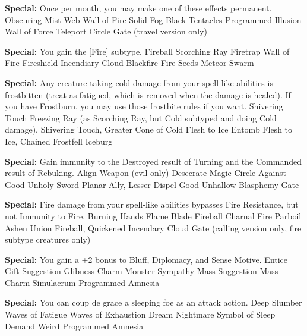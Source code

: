 \begin{multicols}{2}
\textbf{Special: }{Once per month, you may make one of these effects permanent.}
\sphere
{Obscuring Mist}
{Web}
{Wall of Fire}
{Solid Fog}
{Black Tentacles}
{Programmed Illusion}
{Wall of Force}
{Teleport Circle}
{Gate (travel version only)}

\textbf{Special: }{You gain the [Fire] subtype.}
\sphere
{Fireball}
{Scorching Ray}
{Firetrap}
{Wall of Fire}
{Fireshield}
{Incendiary Cloud}
{Blackfire}
{Fire Seeds}
{Meteor Swarm}

\textbf{Special: }{Any creature taking cold damage from your spell-like abilities is frostbitten (treat as fatigued, which is removed when the damage is healed). If you have Frostburn, you may use those frostbite rules if you want.}
\sphere
{Shivering Touch}
{Freezing Ray (as Scorching Ray, but Cold subtyped and doing Cold damage).}
{Shivering Touch, Greater}
{Cone of Cold}
{Flesh to Ice}
{Entomb}
{Flesh to Ice, Chained}
{Frostfell}
{Iceburg}

\textbf{Special: }{Gain immunity to the Destroyed result of Turning and the Commanded result of Rebuking.}
\sphere
{Align Weapon (evil only)}
{Desecrate}
{Magic Circle Against Good}
{Unholy Sword}
{Planar Ally, Lesser}
{Dispel Good}
{Unhallow}
{Blasphemy}
{Gate}

\textbf{Special: }{Fire damage from your spell-like abilities bypasses Fire Resistance, but not Immunity to Fire.}
\sphere
{Burning Hands}
{Flame Blade}
{Fireball}
{Charnal Fire}
{Parboil}
{Ashen Union}
{Fireball, Quickened}
{Incendary Cloud}
{Gate (calling version only, fire subtype creatures only)}

\textbf{Special: }{You gain a +2 bonus to Bluff, Diplomacy, and Sense Motive.}
\sphere
{Entice Gift}
{Suggestion}
{Glibness}
{Charm Monster}
{Sympathy}
{Mass Suggestion}
{Mass Charm}
{Simulacrum}
{Programmed Amnesia}

\textbf{Special: }{You can coup de grace a sleeping foe as an attack action.}
\sphere
{Deep Slumber}
{Waves of Fatigue}
{Waves of Exhaustion}
{Dream}
{Nightmare}
{Symbol of Sleep}
{Demand}
{Weird}
{Programmed Amnesia}


\end{multicols}
